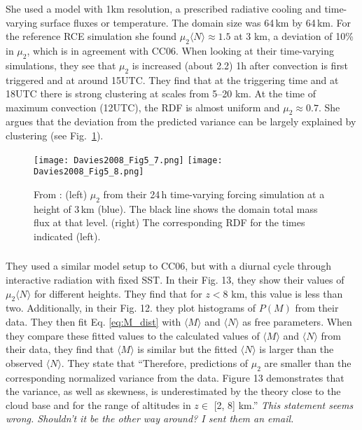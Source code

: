 \documentclass[a4paper, 12pt]{article}
\begin{document}
\subsubsection{\cite{Davies2008}}
She used a model with 1km resolution, a prescribed radiative cooling and time-varying surface fluxes or temperature. The domain size was 64\,km by 64\,km. For the reference RCE simulation she found $\mu_2 \langle N \rangle \approx 1.5$ at 3 km, a deviation of 10\% in $\mu_2$, which is in agreement with CC06. When looking at their time-varying simulations, they see that $\mu_2$ is increased (about 2.2) 1h after convection is first triggered and at around 15UTC. They find that at the triggering time and at 18UTC there is strong clustering at scales from 5--20 km. At the time of maximum convection (12UTC), the RDF is almost uniform and $\mu_2 \approx 0.7$. She argues that the deviation from the predicted variance can be largely explained by clustering (see Fig.~\ref{fig:Davies2008}). 

\begin{figure}[ht]
\noindent \centering
\texttt{[image: Davies2008\_Fig5\_7.png]}
\texttt{[image: Davies2008\_Fig5\_8.png]}\\
\caption{From \cite{Davies2008}: (left) $\mu_2$ from their 24\,h time-varying forcing simulation at a height of 3\,km (blue). The black line shows the domain total mass flux at that level. (right) The corresponding RDF for the times indicated (left).} \label{fig:Davies2008}
\end{figure}


\subsubsection{\cite{Davoudi2010}}
They used a similar model setup to CC06, but with a diurnal cycle through interactive radiation with fixed SST. In their Fig. 13, they show their values of $\mu_2 \langle N \rangle$ for different heights. They find that for $z <$8 km, this value is less than two. Additionally, in their Fig. 12. they plot histograms of $P(M)$ from their data. They then fit Eq. \ref{eq:M_dist} with $\langle M \rangle$ and $\langle N \rangle$ as free parameters. When they compare these fitted values to the calculated values of $\langle M \rangle$ and $\langle N \rangle$ from their data, they find that $\langle M \rangle$  is similar but the fitted $\langle N \rangle$ is larger than the observed $\langle N \rangle$. They state that ``Therefore, predictions of $\mu_2$ are smaller than the corresponding normalized variance from the data. Figure 13 demonstrates that the variance, as well as skewness, is underestimated by the theory close to the cloud base and for the range of altitudes in $z \in$  [2, 8] km.'' \textit{This statement seems wrong. Shouldn't it be the other way around? I sent them an email.}
\end{document}
